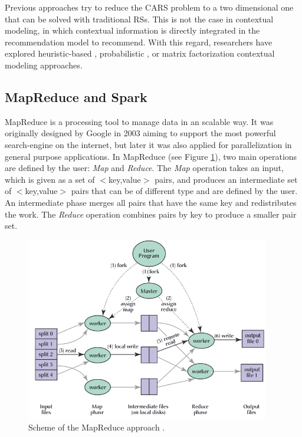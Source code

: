 \documentclass[preprint]{elsarticle}
\begin{document}
\begin{spacing}{1.5}
Previous approaches try to reduce the CARS problem to a two dimensional one that can be solved with traditional RSs. This is not the case in contextual modeling, in which contextual information is directly integrated in the recommendation model to recommend. With this regard, researchers have explored heuristic-based \cite{Panniello2014}, probabilistic \cite{Adomavicius2005b}, or matrix factorization \cite{Baltrunas2011c} contextual modeling approaches.

\subsection{MapReduce and Spark}
\label{sec:background-mapreduce-and-spark}

MapReduce \cite{Dean2008} is a processing tool to manage data in an scalable way. It was originally designed by Google in 2003 aiming to support the most powerful search-engine on the internet, but later it was also applied for parallelization in general purpose applications. In MapReduce (see Figure \ref{fig:background-mapreduce}), two main operations are defined by the user: \emph{Map} and \emph{Reduce}. The \emph{Map} operation takes an input, which is given as a set of $<$key,value$>$ pairs, and produces an intermediate set of $<$key,value$>$ pairs that can be of different type and are defined by the user. An intermediate phase merges all pairs that have the same key and redistributes the work. The \emph{Reduce} operation combines pairs by key to produce a smaller pair set.

\begin{figure}[h]
	\centering
	\includegraphics[width=0.95\textwidth]{figures/mapreduce.png}
	\caption{Scheme of the MapReduce approach \cite{Dean2008}.}
	\label{fig:background-mapreduce}
\end{figure}


\end{spacing}
\end{document}
